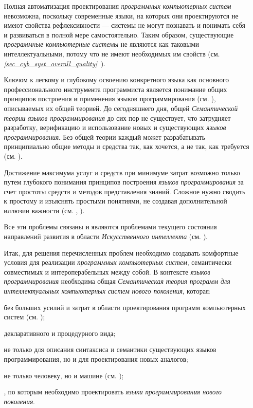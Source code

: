 \begin{textitemize}
    \item Полная автоматизация проектирования \textit{программных компьютерных систем} невозможна, поскольку современные языки, на которых они проектируются не имеют свойства рефлексивности --- системы не могут познавать и понимать себя и развиваться в полной мере самостоятельно. Таким образом, существующие \textit{программные компьютерные системы} не являются как таковыми интеллектуальными, потому что не имеют необходимых им свойств (см. \textit{\ref{sec_cyb_syst_overall_quality}~}).
    \item Ключом к легкому и глубокому освоению конкретного языка как основного профессионального инструмента программиста является понимание общих принципов построения и применения языков программирования (см. ), описываемых их общей теорией. До сегодняшнего дня, общей \textit{Семантической теории языков программирования} до сих пор не существует, что затрудняет разработку, верификацию и использование новых и существующих \textit{языков программирования}. Без общей теории каждый может разрабатывать принципиально общие методы и средства так, как хочется, а не так, как требуется (см. ).
    \item Достижение максимума услуг и средств при минимуме затрат возможно только путем глубокого понимания принципов построения \textit{языков программирования} за счет простоты средств и методов представления знаний. Сложное нужно сводить к простому и изъяснять простыми понятиями, не создавая дополнительной иллюзии важности (см. , ).
\end{textitemize}

Все эти проблемы связаны и являются проблемами текущего состояния направлений развития в области \textit{Искусственного интеллекта} (см. ).

Итак, для решения перечисленных проблем необходимо создавать комфортные условия для реализации \textit{программных компьютерных систем}, семантически совместимых и интероперабельных между собой. В контексте \textit{языков программирования} необходима общая \textit{Семантическая теория программ для интеллектуальных компьютерных систем нового поколения}, которая:
\begin{textitemize}
    \item {} без больших усилий и затрат  в области проектирования программ компьютерных систем (см. );
    \item {} декларативного и процедурного вида;
    \item {} не только для описания синтаксиса и семантики существующих языков программирования, но и для проектирования новых аналогов;
    \item {} не только человеку, но и машине (см. );
    \item {}, по которым необходимо проектировать \textit{языки программирования нового поколения}.
\end{textitemize}

